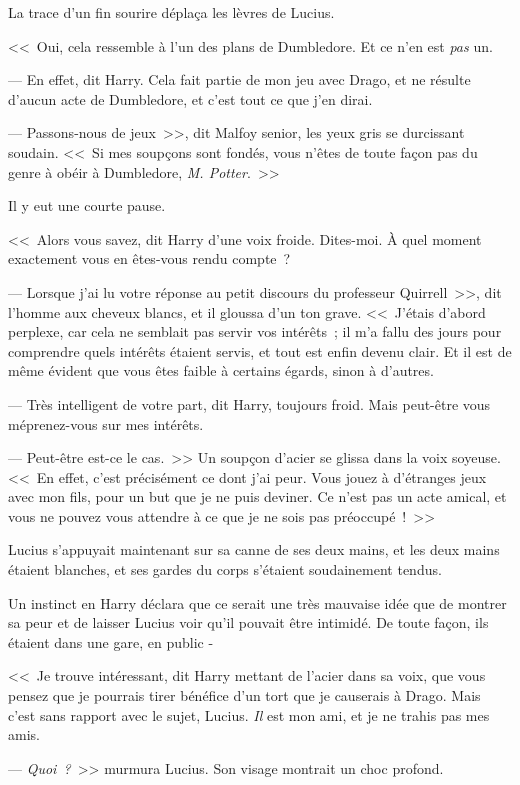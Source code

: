 La trace d'un fin sourire déplaça les lèvres de Lucius.

<<~Oui, cela ressemble à l'un des plans de Dumbledore. Et ce n'en est \emph{pas} un.

--- En effet, dit Harry. Cela fait partie de mon jeu avec Drago, et ne résulte d'aucun acte de Dumbledore, et c'est tout ce que j'en dirai.

--- Passons-nous de jeux~>>, dit Malfoy senior, les yeux gris se durcissant soudain. <<~Si mes soupçons sont fondés, vous n'êtes de toute façon pas du genre à obéir à Dumbledore, \emph{M. Potter}.~>>

Il y eut une courte pause.

<<~Alors vous savez, dit Harry d'une voix froide. Dites-moi. À quel moment exactement vous en êtes-vous rendu compte~?

--- Lorsque j'ai lu votre réponse au petit discours du professeur Quirrell~>>, dit l'homme aux cheveux blancs, et il gloussa d'un ton grave. <<~J'étais d'abord perplexe, car cela ne semblait pas servir vos intérêts~; il m'a fallu des jours pour comprendre quels intérêts étaient servis, et tout est enfin devenu clair. Et il est de même évident que vous êtes faible à certains égards, sinon à d'autres.

--- Très intelligent de votre part, dit Harry, toujours froid. Mais peut-être vous méprenez-vous sur mes intérêts.

--- Peut-être est-ce le cas.~>> Un soupçon d'acier se glissa dans la voix soyeuse. <<~En effet, c'est précisément ce dont j'ai peur. Vous jouez à d'étranges jeux avec mon fils, pour un but que je ne puis deviner. Ce n'est pas un acte amical, et vous ne pouvez vous attendre à ce que je ne sois pas préoccupé~!~>>

Lucius s'appuyait maintenant sur sa canne de ses deux mains, et les deux mains étaient blanches, et ses gardes du corps s'étaient soudainement tendus.

Un instinct en Harry déclara que ce serait une très mauvaise idée que de montrer sa peur et de laisser Lucius voir qu'il pouvait être intimidé. De toute façon, ils étaient dans une gare, en public -

<<~Je trouve intéressant, dit Harry mettant de l'acier dans sa voix, que vous pensez que je pourrais tirer bénéfice d'un tort que je causerais à Drago. Mais c'est sans rapport avec le sujet, Lucius. \emph{Il} est mon ami, et je ne trahis pas mes amis.

--- \emph{Quoi~?}~>> murmura Lucius. Son visage montrait un choc profond.

